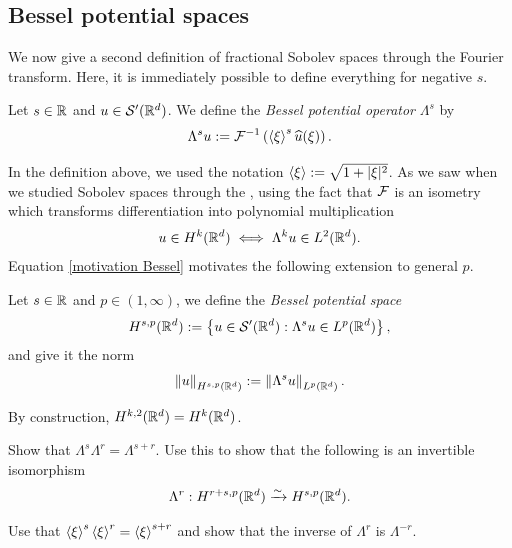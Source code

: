 \documentclass[
    a4paper,
    DIV=14,
    abstract=true,
    numbers=noenddot
]{scrartcl}
\begin{document}
\subsection{Bessel potential spaces}
We now give a second definition of fractional Sobolev spaces through the Fourier transform. Here, it is immediately possible to define everything for negative $s$.
\begin{definition}
    Let  $s\in\mathbb{R}$ and $u \in \mathcal{S}'(\mathbb{R}^d)$. We define the \emph{Bessel potential operator} $\Lambda^s$ by
    \begin{align*}
        \Lambda^s u := \mathcal{F}^{-1}\left(\left\langle\xi\right\rangle^s \widehat{u}(\xi)\right).
    \end{align*}
\end{definition}
In the definition above, we used the notation $\left\langle\xi\right\rangle:=\sqrt{1+|\xi|^2}$. As we saw when we studied Sobolev spaces through the , using the fact that $\mathcal{F} $ is an isometry which transforms differentiation into polynomial multiplication
\begin{align}\label{motivation Bessel}
    u \in H^k(\mathbb{R}^d) \iff \Lambda^k u \in L^2(\mathbb{R}^d).
\end{align}
Equation \eqref{motivation Bessel} motivates the following extension to general $p$.

\begin{definition}\label{bessel potential def}
    Let $s \in \mathbb{R}$ and $p \in (1,\infty)$, we define the \emph{Bessel potential space}
    \begin{align*}
        H^{s,p}(\mathbb{R}^d):=\left\{u \in \mathcal{S}^{\prime}(\mathbb{R}^d): \Lambda ^s u \in L^p(\mathbb{R}^d)\right\},
    \end{align*}
    and give it the norm
    \begin{align*}
        \left\lVert u \right\rVert_{H^{s,p}(\mathbb{R}^d)}:= \left\lVert \Lambda^s u \right\rVert_{L^p(\mathbb{R}^d)}.
    \end{align*}
\end{definition}
By construction, $H^{k,2}(\mathbb{R}^d)=H^{k}(\mathbb{R}^d)$.
\begin{exercise}
    Show that $\Lambda^s\Lambda^r=\Lambda^{s+r}$. Use this to show that the following is an invertible isomorphism
    \begin{align*}
        \Lambda^r: H^{r+s,p}(\mathbb{R}^d) \xrightarrow{\sim}  H^{s,p}(\mathbb{R}^d).
    \end{align*}
\end{exercise}
\begin{hint}
    Use that $\left\langle\xi\right\rangle^s\left\langle\xi\right\rangle^r=\left\langle\xi\right\rangle^{s+r}$ and show that the inverse of $\Lambda^r$ is $\Lambda^{-r}$.
\end{hint}
\end{document}
